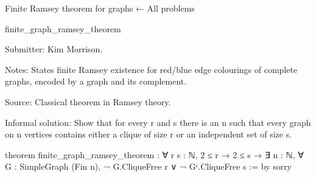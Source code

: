 Finite Ramsey theorem for graphs
← All problems

finite_graph_ramsey_theorem

Submitter: Kim Morrison.

Notes: States finite Ramsey existence for red/blue edge colourings of complete graphs, encoded by a graph and its complement.

Source: Classical theorem in Ramsey theory.

Informal solution: Show that for every r and s there is an n such that every graph on n vertices contains either a clique of size r or an independent set of size s.

theorem finite_graph_ramsey_theorem :
    ∀ r s : ℕ, 2 ≤ r → 2 ≤ s → ∃ n : ℕ, ∀ G : SimpleGraph (Fin n), ¬ G.CliqueFree r ∨ ¬ Gᶜ.CliqueFree s := by
  sorry